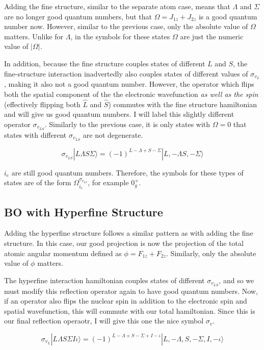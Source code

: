 \documentclass[prl, longbibliography]{revtex4-2}
\begin{document}
Adding the fine structure, similar to the separate atom case, means that $\Lambda$ and $\Sigma$ are no longer good quantum numbers, but that $\Omega=J_{1z}+J_{2z}$ is a good quantum number now. However, similar to the previous case, only the absolute value of $\Omega$ matters. Unlike for $\Lambda$, in the symbols for these states $\Omega$ are just the numeric value of $|\Omega|$. 

In addition, because the fine structure couples states of different $L$ and $S$, the fine-structure interaction inadvertedly also couples states of different values of $\sigma_{v_L}$, making it also not a good quantum number. However, the operator which flips both the spatial component of the the electronic wavefunction \emph{as well as the spin} (effectively flipping both $\hat{L}$ and $\hat{S}$) commutes with the fine structure hamiltonian and will give us good quantum numbers. I will label this slightly different operator $\sigma_{v_{LS}}$. Similarly to the previous case, it is only states with $\Omega=0$ that states with different $\sigma_{v_{LS}}$ are not degenerate.

$$
\sigma_{v_{LS}}|L\Lambda S \Sigma\rangle = (-1)^{L-\Lambda+S-\Sigma}|L,-\Lambda S, -\Sigma\rangle
$$

$i_e$ are still good quantum numbers. Therefore, the symbols for these types of states are of the form $\Omega_{i_e}^{\sigma_{v_{LS}}}$, for example $0_g^+$.

\subsection{BO with Hyperfine Structure}

Adding the hyperfine structure follows a similar pattern as with adding the fine structure. In this case, our good projection is now the projection of the total atomic angular momentum defined as $\phi=F_{1z}+F_{2z}$. Similarly, only the absolute value of $\phi$ matters. 

The hyperfine interaction hamiltonian couples states of different $\sigma_{v_{LS}}$, and so we must modify this reflection operator again to have good quantum numbers. Now, if an operator also flips the nuclear spin in addition to the electronic spin and spatial wavefunction, this will commute with our total hamiltonian. Since this is our final reflection operaotr, I will give this one the nice symbol $\sigma_v$. 

$$
\sigma_{v_L}|L\Lambda S \Sigma I \iota\rangle = (-1)^{L-\Lambda+S-\Sigma+I-\iota}|L,-\Lambda, S, -\Sigma, I, -\iota\rangle
$$
\end{document}
